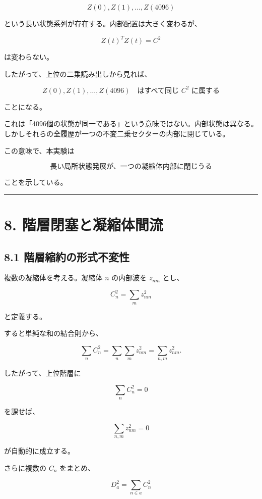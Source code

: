 \documentclass[
  a4paper,
]{ltjsarticle}
\begin{document}
\[
Z(0),Z(1),\ldots,Z(4096)
\]

という長い状態系列が存在する。内部配置は大きく変わるが、

\[
Z(t)^T Z(t)=C^2
\]

は変わらない。

したがって、上位の二乗読み出しから見れば、

\[
\boxed{
Z(0),Z(1),\ldots,Z(4096)
\quad\text{はすべて同じ }C^2\text{ に属する}
}
\]

ことになる。

これは「4096個の状態が同一である」という意味ではない。内部状態は異なる。しかしそれらの全履歴が一つの不変二乗セクターの内部に閉じている。

この意味で、本実験は

\[
\boxed{
\text{長い局所状態発展が、一つの凝縮体内部に閉じうる}
}
\]

ことを示している。

\begin{center}\rule{0.5\linewidth}{0.5pt}\end{center}

\section{8.
階層閉塞と凝縮体間流}\label{ux968eux5c64ux9589ux585eux3068ux51ddux7e2eux4f53ux9593ux6d41}

\subsection{8.1
階層縮約の形式不変性}\label{ux968eux5c64ux7e2eux7d04ux306eux5f62ux5f0fux4e0dux5909ux6027}

複数の凝縮体を考える。凝縮体 \(n\) の内部波を \(z_{nm}\) とし、

\[
\boxed{
C_n^2=\sum_m z_{nm}^2
}
\]

と定義する。

すると単純な和の結合則から、

\[
\sum_n C_n^2
=
\sum_n\sum_m z_{nm}^2
=
\sum_{n,m}z_{nm}^2.
\]

したがって、上位階層に

\[
\boxed{
\sum_n C_n^2=0
}
\]

を課せば、

\[
\boxed{
\sum_{n,m}z_{nm}^2=0
}
\]

が自動的に成立する。

さらに複数の \(C_n\) をまとめ、

\[
D_a^2=\sum_{n\in a}C_n^2
\]
\end{document}
